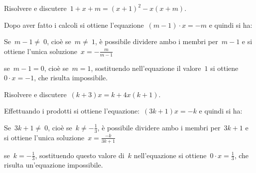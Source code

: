 
 \begin{esempio}
Risolvere e discutere~\(1+x+m=(x+1)^{2}-x(x+m)\).

Dopo aver fatto i calcoli si ottiene l'equazione~\((m-1)\cdot x=-m\) e quindi 
si ha:
\begin{itemize*}
 \item Se~\(m-1\neq~0\), cioè se~\(m\neq~1\), è possibile dividere ambo i membri 
 per~\(m-1\) e si ottiene l'unica soluzione~\(x=-{\frac{m}{m-1}}\)
 \item se~\(m-1=0\), cioè se~\(m=1\), sostituendo nell'equazione il valore~\(1\) si 
 ottiene~\(0\cdot x=-1\), che risulta impossibile.
\end{itemize*}
 \end{esempio}

 \begin{esempio}
Risolvere e discutere~\((k+3)x=k+4x(k+1)\).

Effettuando i prodotti si ottiene l'equazione:~\((3k+1)x=-k\) e quindi si ha:
\begin{itemize*}
 \item Se~\(3k+1\neq~0\), cioè se~\(k\neq -{\frac{1}{3}}\), è possibile dividere 
 ambo i membri per~\(3k+1\) e si ottiene l'unica soluzione~\(x=\frac{-k}{3k+1}\)
 \item se~\(k=-{\frac{1}{3}}\), sostituendo questo valore di~\(k\) nell'equazione 
 si ottiene~\(0\cdot x=\frac{1}{3}\), che risulta un'equazione impossibile.
\end{itemize*}
 \end{esempio}

